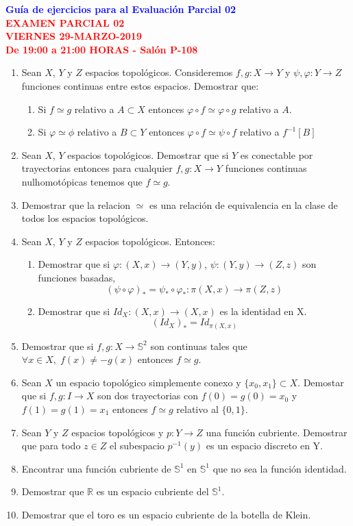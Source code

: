 \documentclass[12pts]{report}
\newcommand{\R}{\mathbb R}
\newcommand{\s}{\mathbb S}
\begin{document}
\begin{center}
\textcolor{blue}{\textbf{\large Guía de ejercicios para al Evaluación Parcial 02}}\\
\vspace{0.5 cm}
\textcolor{red}{\textbf{\large EXAMEN PARCIAL 02 \\ VIERNES
29-MARZO-2019\\ De 19:00 a 21:00 HORAS - Salón P-108}}
\end{center}

\begin{enumerate}
\item Sean $X$, $Y$ y $Z$ espacios topológicos. Consideremos $f,g: X\to Y$ y $\psi ,\varphi: Y \to Z$ funciones continuas entre estos espacios. Demostrar que:
\begin{enumerate}
\item Si $f\simeq g$ relativo a $A\subset X$ entonces $\varphi \circ f \simeq \varphi\circ g$ relativo a $A$.
\item Si $\varphi \simeq \phi$ relativo a $B\subset Y$ entonces $\varphi \circ f \simeq \psi \circ f$ relativo a $f^{-1}[B]$
\end{enumerate} 
\item Sean $X$, $Y$ espacios topológicos. Demostrar que si $Y$ es conectable por trayectorias entonces para cualquier $f,g : X\to Y$ funciones continuas nulhomotópicas tenemos que $f\simeq g$.
\item Demostrar que la relacion $\simeq$ es una relación de equivalencia en la clase de todos los espacios topológicos.
\item Sean $X$, $Y$ y $Z$ espacios topológicos. Entonces:
\begin{enumerate}
\item Demostrar que si $\varphi: (X,x) \to (Y,y)$, $\psi: (Y,y) \to (Z,z)$ son funciones basadas,
$$(\psi \circ \varphi)_* = \psi_*\circ \varphi_* : \pi(X,x)\to \pi(Z,z)$$
\item Demostrar que si $Id_X: (X,x)\to (X,x)$ es la identidad en X.
$$(Id_X)_* = Id_{\pi(X,x)}$$
\end{enumerate}
\item Demostrar que si $f,g :X \to \s^2$ son continuas tales que $\forall x\in X,\; f(x)\neq -g(x)$ entonces $f\simeq g$.
\item Sean $X$ un espacio topológico simplemente conexo y $\{x_0,x_1\}\subset X$. Demostar que si $f,g: I \to X$ son dos trayectorias con $f(0)=g(0)=x_0$ y $f(1)=g(1)=x_1$ entonces $f\simeq g$ relativo al $\{0,1\}$.
\item Sean $Y$ y $Z$ espacios topológicos y $p: Y \to Z$ una función cubriente. Demostrar que para todo $z\in Z$ el subespacio $p^{-1}(y)$ es un espacio discreto en Y.
\item Encontrar una función cubriente de $\s^1$ en $\s^1$ que no sea la función identidad.
\item Demostrar que $\R$ es un espacio cubriente del $\s^1$.
\item Demostrar que el toro es un espacio cubriente de la botella de Klein.


\end{enumerate}
\end{document}

